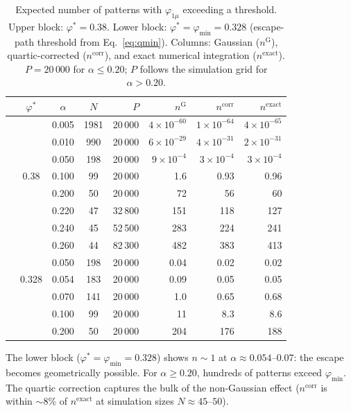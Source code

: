 \documentclass[11pt]{article}
\begin{document}
\begin{table}[h]
\centering
\caption{Expected number of patterns with $\varphi_{1\mu}$ exceeding a threshold.  Upper block: $\varphi^* = 0.38$.  Lower block: $\varphi^* = \varphi_{\min} = 0.328$ (escape-path threshold from Eq.~\eqref{eq:qmin}).  Columns: Gaussian ($n^{\mathrm{G}}$), quartic-corrected ($n^{\mathrm{corr}}$), and exact numerical integration ($n^{\mathrm{exact}}$).  $P = 20\,000$ for $\alpha \leq 0.20$; $P$ follows the simulation grid for $\alpha > 0.20$.}
\label{tab:n_overlap}
\begin{tabular}{ccccrrrr}
\toprule
 & $\varphi^*$ & $\alpha$ & $N$ & $P$ & $n^{\mathrm{G}}$ & $n^{\mathrm{corr}}$ & $n^{\mathrm{exact}}$ \\
\midrule
& & 0.005 & 1981 & 20\,000 & $4\!\times\!10^{-60}$ & $1\!\times\!10^{-64}$ & $4\!\times\!10^{-65}$ \\
& & 0.010 &  990 & 20\,000 & $6\!\times\!10^{-29}$ & $4\!\times\!10^{-31}$ & $2\!\times\!10^{-31}$ \\
& & 0.050 &  198 & 20\,000 & $9\!\times\!10^{-4}$ & $3\!\times\!10^{-4}$ & $3\!\times\!10^{-4}$ \\
& 0.38 & 0.100 &   99 & 20\,000 & 1.6 & 0.93 & 0.96 \\
& & 0.200 &   50 & 20\,000 & 72 & 56 & 60 \\
& & 0.220 &   47 & 32\,800 & 151 & 118 & 127 \\
& & 0.240 &   45 & 52\,500 & 283 & 224 & 241 \\
& & 0.260 &   44 & 82\,300 & 482 & 383 & 413 \\
\midrule
& & 0.050 &  198 & 20\,000 & 0.04 & 0.02 & 0.02 \\
& 0.328 & 0.054 &  183 & 20\,000 & 0.09 & 0.05 & 0.05 \\
& & 0.070 &  141 & 20\,000 & 1.0 & 0.65 & 0.68 \\
& & 0.100 &   99 & 20\,000 & 11 & 8.3 & 8.6 \\
& & 0.200 &   50 & 20\,000 & 204 & 176 & 188 \\
\bottomrule
\end{tabular}
\end{table}

The lower block ($\varphi^* = \varphi_{\min} = 0.328$) shows $n \sim 1$ at $\alpha \approx 0.054$--$0.07$: the escape becomes geometrically possible.  For $\alpha \geq 0.20$, hundreds of patterns exceed $\varphi_{\min}$.  The quartic correction captures the bulk of the non-Gaussian effect ($n^{\mathrm{corr}}$ is within $\sim$8\% of $n^{\mathrm{exact}}$ at simulation sizes $N \approx 45$--$50$).
\end{document}
